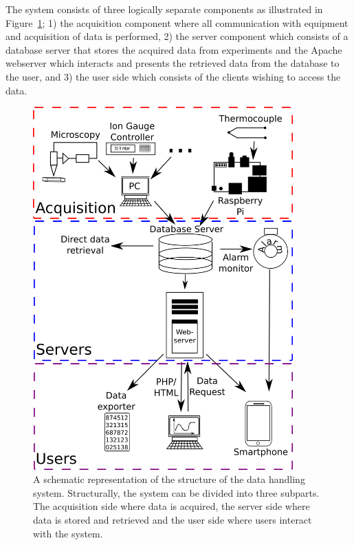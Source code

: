 The system consists of three logically separate components as illustrated in
Figure~\ref{fig:system_overview}; 1) the acquisition component where all
communication with equipment and acquisition of data is performed, 2) the server
component which consists of a database server that stores the acquired data from
experiments and the Apache webserver which interacts and presents the retrieved
data from the database to the user, and 3) the user side
which consists of the clients wishing to access the data.

\begin{figure}
 \begin{center}
 \includegraphics[width=10cm]{system_overview.png}
 \caption{ A schematic representation of the structure of the data handling
   system. Structurally, the system can be divided into three subparts. The
   acquisition side where data is acquired, the server side where data is
   stored and retrieved and the user side where users interact with the system.
   \label{fig:system_overview}
 } 
 \end{center}
\end{figure}

